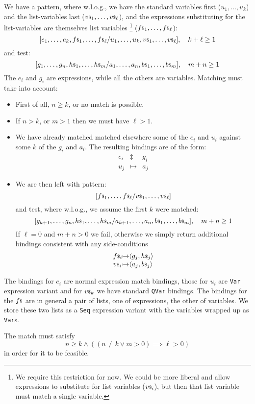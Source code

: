 We have a pattern, where w.l.o.g., we have the standard variables first
($u_1,\ldots,u_k$) and the list-variables last ($ {v}{\scriptstyle\$}_1,\ldots,{v}{\scriptstyle\$}_\ell$),
and the expressions substituting for the list-variables are themselves
list variables%
\footnote{We require this restriction for now. We could be more liberal
and allow expressions to substitute for list variables (${v}{\scriptstyle\$}_i$),
but then that list variable must match a single variable.}
 (${f}{\scriptstyle\$}_1,\ldots,{f}{\scriptstyle\$}_\ell$):
$$
 [ e_1,\ldots,e_k , {f}{\scriptstyle\$}_1,\ldots,{f}{\scriptstyle\$}_\ell
 /
   u_1,\ldots,u_k ,  {v}{\scriptstyle\$}_1,\ldots,{v}{\scriptstyle\$}_\ell ]
 , \quad k+\ell \geq 1
$$
and test:
$$
 [ g_1,\ldots,g_n , {h}{\scriptstyle\$}_1,\ldots,{h}{\scriptstyle\$}_m
 /
   a_1,\ldots,a_n ,  {b}{\scriptstyle\$}_1,\ldots,{b}{\scriptstyle\$}_m ]
 , \quad m+n \geq 1
$$
The $e_i$ and $g_i$ are expressions,
while all the others are variables.
Matching must take into account:
\begin{itemize}
  \item First of all, $n \geq k$, or no match is possible.
  \item If $n > k$, or $m > 1$ then we must have $\ell > 1$.
  \item We have already matched matched elsewhere some of the $e_i$ and $u_i$
        against some $k$ of the $g_i$ and $a_i$.
        The resulting bindings are of the form:
        $$
          \begin{array}{ccc}
             e_i & \ddagger & g_i
          \\ u_j & \mapsto & a_j
          \end{array}
        $$
  \item We are then left with pattern:
        $$
        [  {f}{\scriptstyle\$}_1,\ldots,{f}{\scriptstyle\$}_\ell
        /
           {v}{\scriptstyle\$}_1,\ldots,{v}{\scriptstyle\$}_\ell ]
        $$
        and test, where w.l.o.g., we assume the first $k$ were matched:
        $$
         [ g_{k+1},\ldots,g_n , {h}{\scriptstyle\$}_1,\ldots,{h}{\scriptstyle\$}_m
         /
         a_{k+1},\ldots,a_n ,  {b}{\scriptstyle\$}_1,\ldots,{b}{\scriptstyle\$}_m ]
         , \quad m+n \geq 1
        $$
        If $\ell=0$ and $m+n > 0$ we fail,
        otherwise we simply return additional bindings
        consistent with any side-conditions
        $$
         \begin{array}{l@{\mapsto}l}
            \lst f_i & \seqof{g_j,\lst h_j}
         \\ \lst v_i & \seqof{a_j,\lst b_j}
         \end{array}
        $$
\end{itemize}
The bindings for $e_i$ are normal expression match bindings,
those for $u_i$ are \texttt{Var} expression variant
and for ${v}{\scriptstyle\$}_k$ we have standard \texttt{QVar} bindings.
The bindings for the ${f}{\scriptstyle\$}$ are in general a pair of lists,
one of expressions, the other of variables.
We store these two lists as  a \texttt{Seq} expression variant
with the variables wrapped up as \texttt{Var}s.

The match  must satisfy
$$
  n \geq k \land ((n \neq k \lor m > 0) \implies \ell > 0)
$$
in order for it to be feasible.
